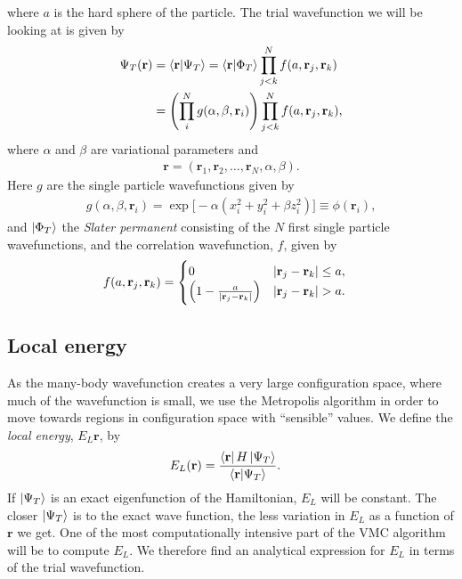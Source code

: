 \documentclass[
    a4paper, aps, twocolumn, floatfix, superscriptaddress]{revtex4-1}
\newcommand{\vf}{\mathbf}
\newcommand{\1}{\mathds{1}}
\begin{document}
    where $a$ is the hard sphere of the particle. The trial wavefunction we will
    be looking at is given by
    \begin{align}
        \Psi_T(\vf{r})
        &= \bra{\vf{r}}\ket{\Psi_T}
        = \bra{\vf{r}}\ket{\Phi_T}
        \prod_{j < k}^N f(a, \vf{r}_j, \vf{r}_k) \\
        &= \Biggl(
            \prod_i^N g(\alpha, \beta, \vf{r}_i)
        \Biggr)
        \prod_{j < k}^N f(a, \vf{r}_j, \vf{r}_k),
        \label{eq:initial_trial_wavefunction}
    \end{align}
    where $\alpha$ and $\beta$ are variational parameters and
    \begin{align}
        \vf{r} = (\vf{r}_1, \vf{r}_2, \dots, \vf{r}_N, \alpha, \beta).
    \end{align}
    Here $g$ are the single particle wavefunctions given by
    \begin{align}
        g(\alpha, \beta, \vf{r}_i)
        = \exp\bigl[
            -\alpha(x_i^2 + y_i^2 + \beta z_i^2)
        \bigr] \equiv \phi(\vf{r}_i),
    \end{align}
    and $\ket{\Phi_T}$ the \textit{Slater permanent} consisting of the $N$ first
    single particle wavefunctions, and the correlation wavefunction, $f$, given
    by
    \begin{align}
        f(a, \vf{r}_j, \vf{r}_k)
        &=
        \begin{cases}
            0 & |\vf{r}_j - \vf{r}_k| \leq a, \\
            \Bigl(
                1 - \frac{a}{|\vf{r}_j - \vf{r}_k|}
            \Bigr) & |\vf{r}_j - \vf{r}_k| > a.
        \end{cases}
    \end{align}

    \subsection{Local energy}
        As the many-body wavefunction creates a very large configuration space,
        where much of the wavefunction is small, we use the Metropolis algorithm
        in order to move towards regions in configuration space with
        ``sensible'' values. We define the \textit{local energy}, $E_L{\vf{r}}$,
        by
        \begin{align}
            E_L(\vf{r})
            &= \frac{\bra{\vf{r}}H\ket{\Psi_T}}{\bra{\vf{r}}\ket{\Psi_T}}.
        \end{align}
        If $\ket{\Psi_T}$ is an exact eigenfunction of the Hamiltonian, $E_L$
        will be constant. The closer $\ket{\Psi_T}$ is to the exact wave
        function, the less variation in $E_L$ as a function of $\vf{r}$ we get.
        One of the most computationally intensive part of the VMC algorithm will
        be to compute $E_L$. We therefore find an analytical expression for
        $E_L$ in terms of the trial wavefunction.
\end{document}
